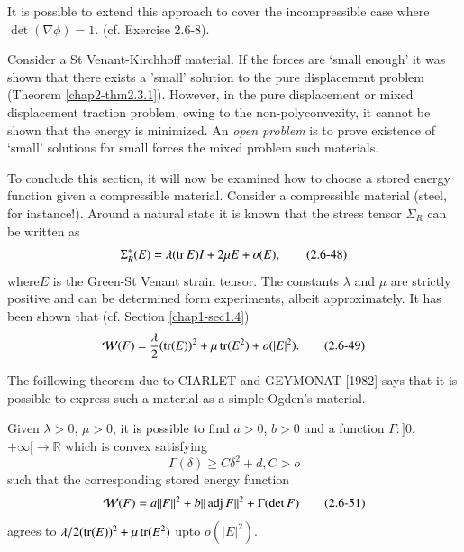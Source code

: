 It is possible to extend this approach to cover the incompressible
case where $\det (\nabla \phi)=1$. (cf. Exercise 2.6-8).  

Consider a St Venant-Kirchhoff material. If the forces are `small
enough' it was shown that there exists a 'small' solution to the pure
displacement problem (Theorem \ref{chap2-thm2.3.1}). However, in the pure
displacement or mixed displacement traction problem, owing to the
non-polyconve\-xity, it cannot be shown that the energy is minimized. An
\textit{open problem} is to prove existence of `small' solutions for
small forces the mixed problem such materials.

To conclude this section, it will now be examined how to choose a
stored energy function given a compressible material. Consider a
compressible material (steel, for instance!). Around a natural state
it is known that the stress tensor $\Sigma_R$ can be written as 
\begin{equation*}
\Sigma ^*_R (E)= \lambda (\operatorname{tr} E)I+2 \mu E+ o
(E), \tag{2.6-48}\label{eq2.6-48} 
\end{equation*}
where\pageoriginale $E$ is the Green-St Venant strain tensor. The
constants 
$\lambda$ and $\mu$ are strictly positive and can be determined form
experiments, albeit approximately. It has been shown that
(cf. Section \ref{chap1-sec1.4}) 
\begin{equation*}
\mathcal{W}(F)= \frac {\lambda}{2} (\operatorname{tr} (E))^2 + \mu \operatorname{tr} (E^2)+ o
(|E|^2). \tag{2.6-49} \label{eq2.6-49}
\end{equation*}

The foillowing theorem due to CIARLET and GEYMONAT [1982] says that
it is possible to express such a material as a simple Ogden's
material.

\begin{theorem}\label{chap2-thm2.6.5} %
 Given $\lambda > 0$, $\mu >0$, it is possible to find $a> 0$, $b>0$
 and a function $\Gamma : ]0$, $+ \infty [ \to \mathbb{R}$ which is convex
    satisfying   
    \begin{equation*}
      \Gamma (\delta) \geq C \delta^2 + d,C >o \tag{2.6-50}\label{eq2.6-50}
    \end{equation*}
    such that the corresponding stored energy function
    \begin{equation*}
      \mathcal{W}(F)= a \| F \| ^2 + b \| \operatorname{adj} F \| ^2 + \Gamma (\det
      F) \tag{2.6-51} \label{eq2.6-51}
    \end{equation*}
    agrees to $\lambda /2 (\operatorname{tr} (E))^2 + \mu \operatorname{tr} (E^2)$ upto $o (|E|^2)$. 
\end{theorem}

